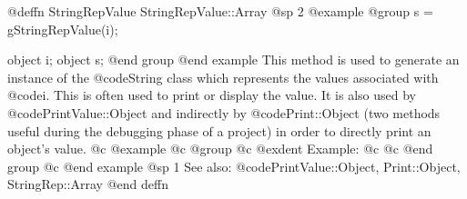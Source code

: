 @deffn {StringRepValue} StringRepValue::Array
@sp 2
@example
@group
s = gStringRepValue(i);

object  i;
object  s;
@end group
@end example
This method is used to generate an instance of the @code{String} class
which represents the values associated with @code{i}.  This is often
used to print or display the value.  It is also used by
@code{PrintValue::Object} and indirectly by @code{Print::Object}
(two methods useful during the debugging phase of a project)
in order to directly print an object's value.
@c @example
@c @group
@c @exdent Example:
@c 
@c @end group
@c @end example
@sp 1
See also:  @code{PrintValue::Object, Print::Object, StringRep::Array}
@end deffn







